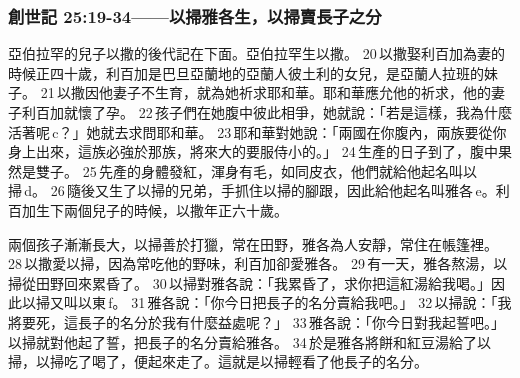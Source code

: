 \subsubsection{創世記 25:19-34——以掃雅各生，以掃賣長子之分}
亞伯拉罕的兒子以撒的後代記在下面。亞伯拉罕生以撒。 20 以撒娶利百加為妻的時候正四十歲，利百加是巴旦亞蘭地的亞蘭人彼土利的女兒，是亞蘭人拉班的妹子。 21 以撒因他妻子不生育，就為她祈求耶和華。耶和華應允他的祈求，他的妻子利百加就懷了孕。 22 孩子們在她腹中彼此相爭，她就說：「若是這樣，我為什麼活著呢 c？」她就去求問耶和華。 23 耶和華對她說：「兩國在你腹內，兩族要從你身上出來，這族必強於那族，將來大的要服侍小的。」 24 生產的日子到了，腹中果然是雙子。 25 先產的身體發紅，渾身有毛，如同皮衣，他們就給他起名叫以掃 d。 26 隨後又生了以掃的兄弟，手抓住以掃的腳跟，因此給他起名叫雅各 e。利百加生下兩個兒子的時候，以撒年正六十歲。

兩個孩子漸漸長大，以掃善於打獵，常在田野，雅各為人安靜，常住在帳篷裡。 28 以撒愛以掃，因為常吃他的野味，利百加卻愛雅各。 29 有一天，雅各熬湯，以掃從田野回來累昏了。 30 以掃對雅各說：「我累昏了，求你把這紅湯給我喝。」因此以掃又叫以東 f。 31 雅各說：「你今日把長子的名分賣給我吧。」 32 以掃說：「我將要死，這長子的名分於我有什麼益處呢？」 33 雅各說：「你今日對我起誓吧。」以掃就對他起了誓，把長子的名分賣給雅各。 34 於是雅各將餅和紅豆湯給了以掃，以掃吃了喝了，便起來走了。這就是以掃輕看了他長子的名分。

